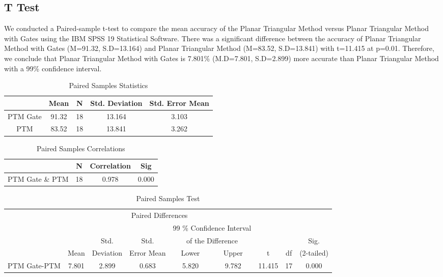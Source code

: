 \documentclass[]{aiaa-tc}%
\begin{document}
\subsection{T Test}

We conducted a Paired-sample t-test to compare the mean accuracy of the Planar Triangular Method versus Planar Triangular Method with Gates using the IBM SPSS 19 Statistical Software. There was a significant difference between the accuracy of Planar Triangular Method with Gates (M=91.32, S.D=13.164) and Planar Triangular Method (M=83.52, S.D=13.841) with t=11.415 at p=0.01. Therefore, we conclude that Planar Triangular Method with Gates is 7.801\% (M.D=7.801, S.D=2.899) more accurate than Planar Triangular Method with a 99\% confidence interval.

\begin{table}[h]
\centering
\begin{tabular}{|c|c|c|c|c|}
\toprule
 & Mean & N & Std. Deviation & Std. Error Mean\\ \hline
PTM Gate & 91.32 & 18 & 13.164 & 3.103\\
PTM & 83.52 & 18 & 13.841 & 3.262\\  
\bottomrule
\end{tabular}%
\caption{Paired Samples Statistics}
\label{table:PS_Statistics}%
\end{table}%

\begin{table}[h]
\centering
\begin{tabular}{|c|c|c|c|}
\toprule
 & N & Correlation & Sig\\ \hline
PTM Gate \& PTM & 18 & 0.978 & 0.000\\ 
\bottomrule
\end{tabular}%
\caption{Paired Samples Correlations}
\label{table:PS_Correlations}%
\end{table}%


\begin{table}[h!]
\centering
\begin{tabular}{|c|c|c|c|c|c|c|c|c|}
\toprule
 & \multicolumn{5}{|c|}{Paired Differences} & & &\\ \cline{2-6}
 & & & & \multicolumn{2}{|c|}{99 \% Confidence Interval} & & &\\
 & &  Std.  & Std.  & \multicolumn{2}{|c|}{of the Difference} & & & Sig.\\ \cline{5-6}
 & Mean & Deviation & Error Mean & Lower & Upper & t & df & (2-tailed) \\ \cline{1-9}
PTM Gate-PTM & 7.801 & 2.899 & 0.683 & 5.820 & 9.782 & 11.415 & 17    & 0.000 \\
\bottomrule
\end{tabular}%
\caption{Paired Samples Test}
\label{tab:PS test}%
\end{table}%
\end{document}
